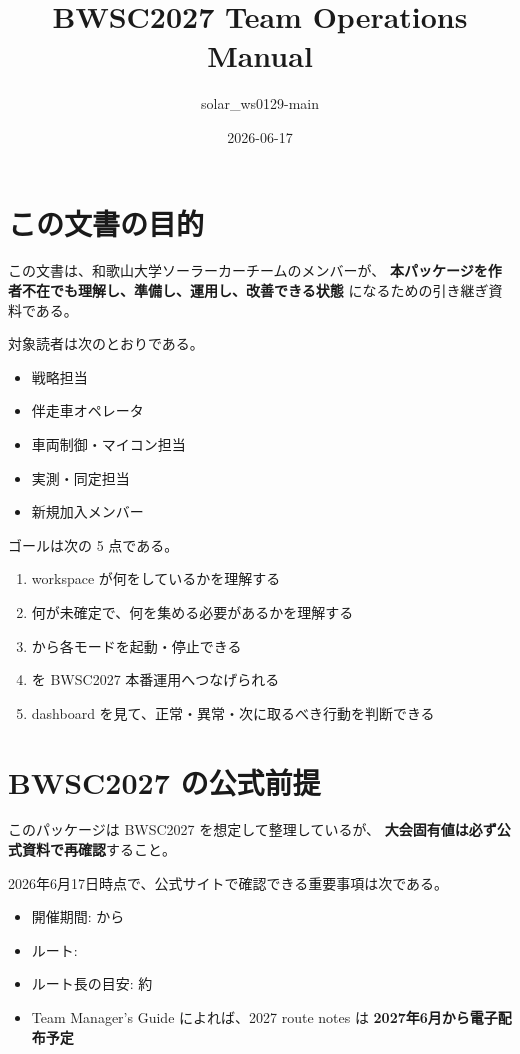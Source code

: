 \documentclass[a4paper,11pt]{article}
\title{BWSC2027 Team Operations Manual}
\author{solar\_ws0129-main}
\date{2026-06-17}
\begin{document}
\maketitle

\section{この文書の目的}

この文書は、和歌山大学ソーラーカーチームのメンバーが、
\textbf{本パッケージを作者不在でも理解し、準備し、運用し、改善できる状態}
になるための引き継ぎ資料である。

対象読者は次のとおりである。

\begin{itemize}
  \item 戦略担当
  \item 伴走車オペレータ
  \item 車両制御・マイコン担当
  \item 実測・同定担当
  \item 新規加入メンバー
\end{itemize}

ゴールは次の 5 点である。

\begin{enumerate}
  \item workspace が何をしているかを理解する
  \item 何が未確定で、何を集める必要があるかを理解する
  \item {} から各モードを起動・停止できる
  \item {} を BWSC2027 本番運用へつなげられる
  \item dashboard を見て、正常・異常・次に取るべき行動を判断できる
\end{enumerate}

\section{BWSC2027 の公式前提}

このパッケージは BWSC2027 を想定して整理しているが、
\textbf{大会固有値は必ず公式資料で再確認}すること。

2026年6月17日時点で、公式サイトで確認できる重要事項は次である。

\begin{itemize}
  \item 開催期間:  から 
  \item ルート: 
  \item ルート長の目安: 約 
  \item Team Manager's Guide によれば、2027 route notes は \textbf{2027年6月から電子配布予定}
\end{itemize}
\end{document}
